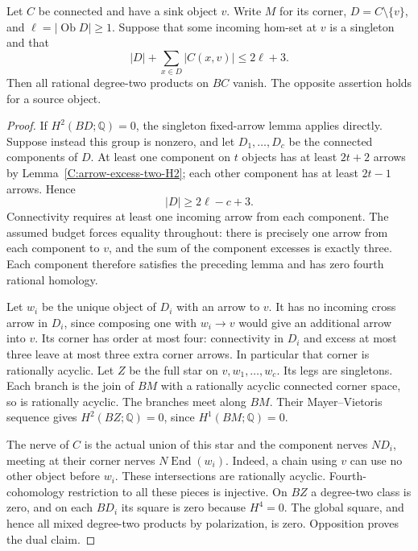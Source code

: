 \begin{lemma}
\label{C:singleton-extreme-three-excess}
Let $C$ be connected and have a sink object $v$. Write $M$
for its corner, $D=C\setminus\{v\}$, and
$\ell=|\operatorname{Ob}D|\geq1$. Suppose that some incoming
hom-set at $v$ is a singleton and that
\[
 |D|+\sum_{x\in D}|C(x,v)|\leq2\ell+3.
\]
Then all rational degree-two products on $BC$ vanish.
The opposite assertion holds for a source object.
\end{lemma}
\begin{proof}
If $H^2(BD;\mathbb Q)=0$, the singleton fixed-arrow lemma
applies directly. Suppose instead this group is nonzero,
and let $D_1,\ldots,D_c$ be the connected components of $D$.
At least one component on $t$ objects has at least $2t+2$
arrows by Lemma~\ref{C:arrow-excess-two-H2}; each other
component has at least $2t-1$ arrows. Hence
\[
 |D|\geq2\ell-c+3.
\]
Connectivity requires at least one incoming arrow from each
component. The assumed budget forces equality throughout:
there is precisely one arrow from each component to $v$,
and the sum of the component excesses is exactly three.
Each component therefore satisfies the preceding lemma and
has zero fourth rational homology.

Let $w_i$ be the unique object of $D_i$ with an arrow to $v$.
It has no incoming cross arrow in $D_i$, since composing one
with $w_i\to v$ would give an additional arrow into $v$.
Its corner has order at most four: connectivity in $D_i$
and excess at most three leave at most three extra corner
arrows. In particular that corner is rationally acyclic.
Let $Z$ be the full star on $v,w_1,\ldots,w_c$. Its legs are
singletons. Each branch is the join of $BM$ with a rationally
acyclic connected corner space, so is rationally acyclic.
The branches meet along $BM$. Their Mayer--Vietoris sequence
gives $H^2(BZ;\mathbb Q)=0$, since $H^1(BM;\mathbb Q)=0$.

The nerve of $C$ is the actual union of this star and the
component nerves $ND_i$, meeting at their corner nerves
$N\operatorname{End}(w_i)$. Indeed, a chain using $v$ can
use no other object before $w_i$. These intersections are
rationally acyclic. Fourth-cohomology restriction to all
these pieces is injective. On $BZ$ a degree-two class is
zero, and on each $BD_i$ its square is zero because $H^4=0$.
The global square, and hence all mixed degree-two products
by polarization, is zero. Opposition proves the dual claim.
\end{proof}

